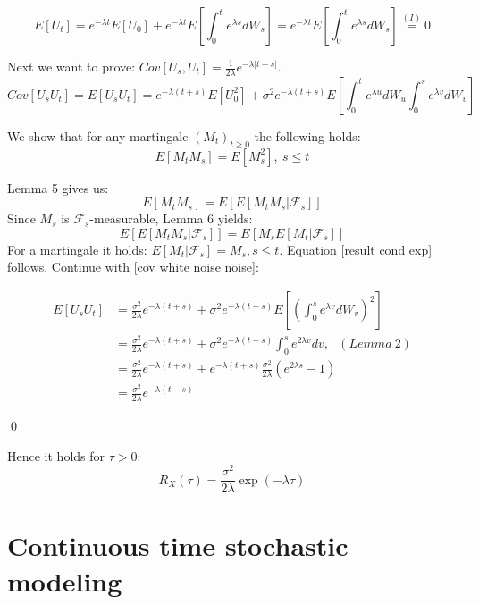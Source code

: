 \documentclass[%
thesis=student,%
coverpage=false,%
titlepage=false,%
headmarks=true, %
english,%
font=libertine, %
math=newpxtx, %
BCOR=5mm,%
coverBCOR=11mm%
]{tumbook}
\begin{document}
\[
E[U_{t}] = e^{-\lambda t}E[U_{0}] + e^{-\lambda t}E[\int_{0}^{t} e^{\lambda s} dW_{s}] = e^{-\lambda t}E[\int_{0}^{t} e^{\lambda s} dW_{s}] \stackrel{(I)}{=}  0
\]

Next we want to prove: $Cov[U_{s},U_{t}] = \frac{1}{2\lambda}e^{-\lambda \lvert t-s \rvert}$. 
\begin{equation}
    Cov[U_{s}U_{t}]=E[U_{s}U_{t}] = e^{-\lambda(t+s)}E[U_{0}^{2}] + \sigma^2 e^{-\lambda(t+s)}E[\int_{0}^{t}e^{\lambda u}dW_{u}\int_{0}^{s}e^{\lambda v}dW_{v}]
    \label{cov white noise noise}
\end{equation}

We show that for any martingale $(M_{t})_{t \geq 0}$ the following holds: 
\begin{equation}
    E[M_{t}M_{s}] = E[M_{s}^{2}], \ s \leq t
    \label{result cond exp}
\end{equation}

Lemma 5 gives us:
\[
E[M_{t}M_{s}] = E[E[M_{t}M_{s}|\mathcal{F}_{s}]]
\]
Since $M_{s}$ is $\mathcal{F}_{s}$-measurable, Lemma 6 yields:
\[
E[E[M_{t}M_{s}|\mathcal{F}_{s}]] = E[M_{s}E[M_{t}|\mathcal{F}_{s}]]
\]
For a martingale it holds: $E[M_{t}|\mathcal{F}_{s}] = M_{s}, s \leq t$. Equation \ref{result cond exp} follows. Continue with \ref{cov white noise noise}:


\begin{subequations}
    \begin{align*}
        E[U_{s}U_{t}] &= \frac{\sigma^2}{2\lambda}e^{-\lambda(t+s)} + \sigma^2 e^{-\lambda(t+s)}E[(\int_{0}^{s}e^{\lambda v}dW_{v})^{2}]   \\
         &= \frac{\sigma^2}{2\lambda}e^{-\lambda(t+s)} + \sigma^2 e^{-\lambda(t+s)}\int_{0}^{s}e^{2\lambda v}dv, \ \ \ (Lemma \ 2) \\
         &= \frac{\sigma^2}{2\lambda}e^{-\lambda(t+s)} + e^{-\lambda(t+s)}\frac{\sigma^2}{2\lambda}(e^{2\lambda s} - 1) \\
         &= \frac{\sigma^2}{2\lambda}e^{-\lambda(t-s)} 
    \end{align*}
\end{subequations}   

\qed

Hence it holds for $\tau > 0$:
\[
R_{X}(\tau) =  \frac{\sigma^2}{2\lambda}\exp(-\lambda\tau)
\]


\section{Continuous time stochastic modeling}
\label{Continuous time stochastic modeling}
\end{document}
